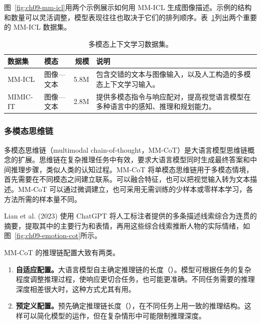 
图~\ref{fig:ch09-mm-icl}用两个示例展示如何用 MM-ICL 生成图像描述。示例的结构和数量可以灵活调整，模型表现往往也取决于它们的排列顺序。表~\ref{tab:ch09-mm-icl}列出两个重要的 MM-ICL 数据集。

\begin{table}[!htbp]
\centering\small
\caption{多模态上下文学习数据集。}
\label{tab:ch09-mm-icl}
\setlength{\tabcolsep}{3pt}
\begin{tabularx}{\linewidth}{@{}llr>{\raggedright\arraybackslash}X@{}}
\toprule
数据集 & 模态 & 规模 & 说明\\
\midrule
MM-ICL & 图像—文本 & 5.8M & 包含交错的文本与图像输入，以及人工构造的多模态上下文学习输入。\\
MIMIC-IT & 图像—文本 & 2.8M & 提供多模态指令与响应配对，提高视觉语言模型在多种语言中的感知、推理和规划能力。\\
\bottomrule
\end{tabularx}
\end{table}

\subsubsection{多模态思维链}
\label{sec:ch09-mm-cot}
\begin{keypoint}
多模态思维链（multimodal chain-of-thought，MM-CoT）是大语言模型思维链概念的扩展。思维链在复杂推理任务中有效，要求大语言模型同时生成最终答案和中间推理步骤，类似人类的认知过程。MM-CoT 将单模态思维链用于多模态情境，首先需要在不同模态之间建立联系。可以融合特征，也可以把视觉输入转为文本描述。MM-CoT 可以通过微调建立，也可采用无需训练的少样本或零样本学习，各方法所需的样本量不同。
\end{keypoint}

Lian et al. (2023) 使用 ChatGPT 将人工标注者提供的多条描述线索综合为连贯的摘要，提取其中的主要行为和表情，再用这些综合线索推断人物的实际情绪，如图~\ref{fig:ch09-emotion-cot}所示。


MM-CoT 的推理链配置大致有两类。
\begin{enumerate}
\item \textbf{自适应配置。}大语言模型自主确定推理链的长度（）。模型可根据任务的复杂程度调整推理过程，使响应更切合任务，也可能更准确。不同任务需要的推理深度相差很大时，这种方式尤其有用。
\item \textbf{预定义配置。}预先确定推理链长度（），在不同任务上用一致的推理结构。这样可以简化模型的运作，但在复杂情形中可能限制推理深度。
\end{enumerate}

